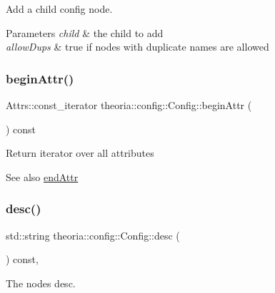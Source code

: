 Add a child config node. 
\begin{DoxyParams}{Parameters}
{\em child} & the child to add \\
\hline
{\em allow\+Dups} & true if nodes with duplicate names are allowed \\
\hline
\end{DoxyParams}
\mbox{\label{classtheoria_1_1config_1_1Config_a4bd7712d99a507b1da47da9257094051}} 
\subsubsection{\texorpdfstring{begin\+Attr()}{beginAttr()}}
{\footnotesize\ttfamily Attrs\+::const\+\_\+iterator theoria\+::config\+::\+Config\+::begin\+Attr (\begin{DoxyParamCaption}{ }\end{DoxyParamCaption}) const\hspace{0.3cm}{\ttfamily [inline]}}

Return iterator over all attributes \begin{DoxySeeAlso}{See also}
\hyperlink{classtheoria_1_1config_1_1Config_a3d4ea72c3b43c8674456fdc263d39e39}{end\+Attr} 
\end{DoxySeeAlso}
\mbox{\label{classtheoria_1_1config_1_1Config_a4d6b2e26d1139819769eaf6bb959b034}} 
\subsubsection{\texorpdfstring{desc()}{desc()}}
{\footnotesize\ttfamily std\+::string theoria\+::config\+::\+Config\+::desc (\begin{DoxyParamCaption}{ }\end{DoxyParamCaption}) const\hspace{0.3cm}{\ttfamily [inline]}, {\ttfamily [noexcept]}}

The nodes desc. \mbox{\label{classtheoria_1_1config_1_1Config_a3d4ea72c3b43c8674456fdc263d39e39}} 
